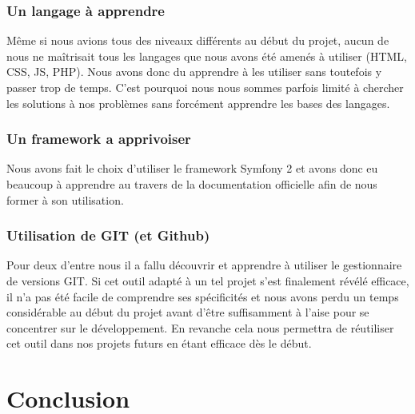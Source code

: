 \documentclass{report}
\begin{document}
    \subsubsection{Un langage à apprendre}
        Même si nous avions tous des niveaux différents au début du projet,
    aucun de nous ne maîtrisait tous les langages que nous avons été amenés à
    utiliser (HTML, CSS, JS, PHP). Nous avons donc du apprendre à les utiliser
    sans toutefois y passer trop de temps. C'est pourquoi nous nous sommes parfois
    limité à chercher les solutions à nos problèmes sans forcément apprendre les
    bases des langages.
    
    \subsubsection{Un framework a apprivoiser}
        Nous avons fait le choix d'utiliser le framework Symfony 2 et avons
    donc eu beaucoup à apprendre au travers de la documentation officielle afin
    de nous former à son utilisation.
    
    \subsubsection{Utilisation de GIT (et Github)}
        Pour deux d'entre nous il a fallu découvrir et apprendre à utiliser le
    gestionnaire de versions GIT. Si cet outil adapté à un tel projet s'est
    finalement révélé efficace, il n'a pas été facile de comprendre ses
    spécificités et nous avons perdu un temps considérable au début du projet
    avant d'être suffisamment à l'aise pour se concentrer sur le développement.
    En revanche cela nous permettra de réutiliser cet outil dans nos projets
    futurs en étant efficace dès le début.
  
  \section*{Conclusion}
\end{document}
